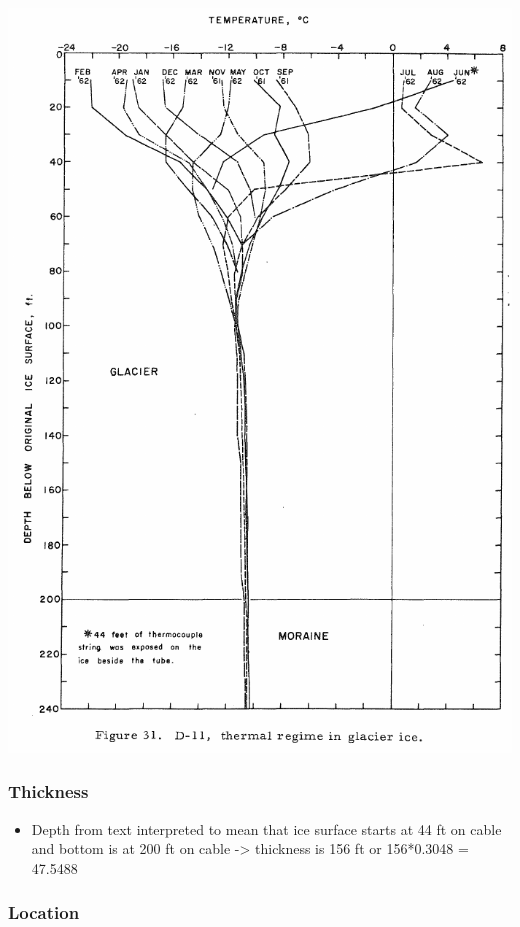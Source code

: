 \documentclass[article,a4paper,times,11pt,twoside]{article}
\begin{document}
\begin{center}
\includegraphics[width=.9\linewidth]{tuto_ramp/davis_1967_fig31.png}
\end{center}


\subsubsection{Thickness}
\label{sec:org78ed2d5}

\begin{itemize}
\item Depth from text interpreted to mean that ice surface starts at 44 ft on cable and bottom is at 200 ft on cable -> thickness is 156 ft or 156*0.3048 = 47.5488
\end{itemize}

\subsubsection{Location}
\label{sec:org713fcd5}
\end{document}
